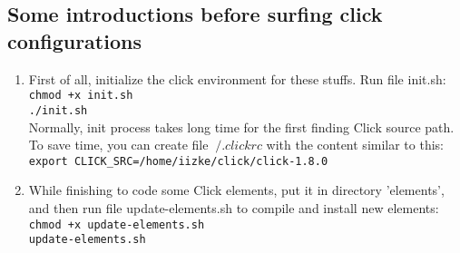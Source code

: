 \documentclass[a4paper]{article}
\begin{document}
    \subsection{Some introductions before surfing click configurations}
      \begin{enumerate}
      	\item 
      	  First of all, initialize the click environment for these stuffs. Run file init.sh: \\
      	    \texttt{chmod +x init.sh\\
      	    ./init.sh}\\
      	  Normally, init process takes long time for the first finding Click source
  path. To save time, you can create file $~/.clickrc$ with the content similar
  to this:\\
            \texttt{export CLICK\_SRC=/home/iizke/click/click-1.8.0}
        
        \item 
          While finishing to code some Click elements, put it in directory 'elements', and then run file update-elements.sh to compile and install new elements: \\
    \texttt{chmod +x update-elements.sh\\
    update-elements.sh}\\
          

\end{enumerate}
\end{document}
